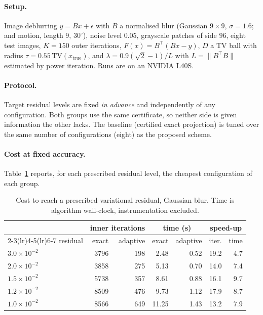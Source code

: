 \documentclass[11pt]{article}
\theoremstyle{plain}
\theoremstyle{definition}
\theoremstyle{remark}
\newcommand{\norm}[1]{\lVert #1 \rVert}
\newcommand{\TV}{\mathrm{TV}}
\begin{document}
\paragraph{Setup.}
Image deblurring $y = Bx + \epsilon$ with $B$ a normalised blur (Gaussian
$9\times9$, $\sigma=1.6$; and motion, length $9$, $30^\circ$), noise level
$0.05$, grayscale patches of side $96$, eight test images, $K=150$ outer
iterations, $F(x)=B^{\!\top}(Bx-y)$, $D$ a TV ball with radius $\tau = 0.55\,
\TV(x_{\mathrm{true}})$, and $\lambda = 0.9(\sqrt2-1)/L$ with $L =
\norm{B^{\!\top}B}$ estimated by power iteration. Runs are on an NVIDIA L40S.

\paragraph{Protocol.}
Target residual levels are fixed \emph{in advance} and independently of any
configuration. Both groups use the same certificate, so neither side is given
information the other lacks. The baseline (certified exact projection) is tuned
over the same number of configurations (eight) as the proposed scheme.

\paragraph{Cost at fixed accuracy.}
Table~\ref{tab:cost} reports, for each prescribed residual level, the cheapest
configuration of each group.

\begin{table}[t]
\centering
\caption{Cost to reach a prescribed variational residual, Gaussian blur. Time
is algorithm wall-clock, instrumentation excluded.}
\label{tab:cost}
\begin{tabular}{lrrrrrr}
\toprule
& \multicolumn{2}{c}{inner iterations} & \multicolumn{2}{c}{time (s)} &
\multicolumn{2}{c}{speed-up} \\
\cmidrule(lr){2-3}\cmidrule(lr){4-5}\cmidrule(lr){6-7}
residual & exact & adaptive & exact & adaptive & iter. & time \\
\midrule
$3.0\times10^{-2}$ & 3796 & 198 & 2.48 & 0.52 & 19.2 & 4.7 \\
$2.0\times10^{-2}$ & 3858 & 275 & 5.13 & 0.70 & 14.0 & 7.4 \\
$1.5\times10^{-2}$ & 5738 & 357 & 8.61 & 0.88 & 16.1 & 9.7 \\
$1.2\times10^{-2}$ & 8509 & 476 & 9.73 & 1.12 & 17.9 & 8.7 \\
$1.0\times10^{-2}$ & 8566 & 649 & 11.25 & 1.43 & 13.2 & 7.9 \\
\bottomrule
\end{tabular}
\end{table}
\end{document}
